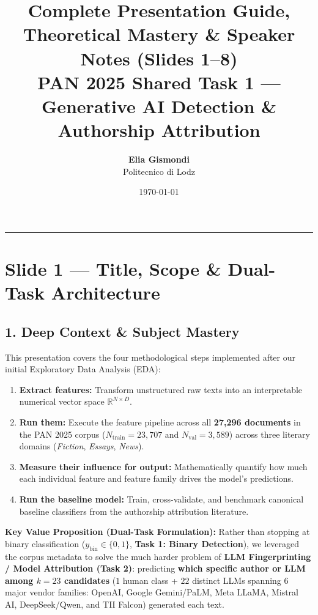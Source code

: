 \documentclass[11pt, a4paper]{article}
\title{\textbf{Complete Presentation Guide, Theoretical Mastery \& Speaker Notes (Slides 1--8)}\\
\large PAN 2025 Shared Task 1 --- Generative AI Detection \& Authorship Attribution}
\author{\textbf{Elia Gismondi} \\ Politecnico di Lodz}
\date{\today}
\begin{document}
\maketitle
\tableofcontents
\vspace{0.5cm}
\hrule
\vspace{0.5cm}

\section{Slide 1 --- Title, Scope \& Dual-Task Architecture}

\subsection*{1. Deep Context \& Subject Mastery}
This presentation covers the four methodological steps implemented after our initial Exploratory Data Analysis (EDA):
\begin{enumerate}[noitemsep]
    \item \textbf{Extract features:} Transform unstructured raw texts into an interpretable numerical vector space $\mathbb{R}^{N \times D}$.
    \item \textbf{Run them:} Execute the feature pipeline across all \textbf{27,296 documents} in the PAN 2025 corpus ($N_{\text{train}} = 23,707$ and $N_{\text{val}} = 3,589$) across three literary domains (\textit{Fiction}, \textit{Essays}, \textit{News}).
    \item \textbf{Measure their influence for output:} Mathematically quantify how much each individual feature and feature family drives the model's predictions.
    \item \textbf{Run the baseline model:} Train, cross-validate, and benchmark canonical baseline classifiers from the authorship attribution literature.
\end{enumerate}

\noindent\textbf{Key Value Proposition (Dual-Task Formulation):}
Rather than stopping at binary classification ($y_{\text{bin}} \in \{0, 1\}$, \textbf{Task 1: Binary Detection}), we leveraged the corpus metadata to solve the much harder problem of \textbf{LLM Fingerprinting / Model Attribution (Task 2)}: predicting \textbf{which specific author or LLM among $k = 23$ candidates} ($1$ human class + $22$ distinct LLMs spanning $6$ major vendor families: OpenAI, Google Gemini/PaLM, Meta LLaMA, Mistral AI, DeepSeek/Qwen, and TII Falcon) generated each text.
\end{document}
